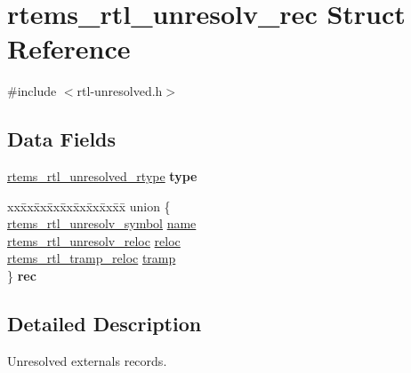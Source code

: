 \hypertarget{structrtems__rtl__unresolv__rec}{}\section{rtems\+\_\+rtl\+\_\+unresolv\+\_\+rec Struct Reference}
\label{structrtems__rtl__unresolv__rec}


{\ttfamily \#include $<$rtl-\/unresolved.\+h$>$}

\subsection*{Data Fields}
\begin{DoxyCompactItemize}
\item 
\mbox{\label{structrtems__rtl__unresolv__rec_ac08e3b3b2a8c3d893ed420b2c94ccee2}} 
\mbox{\hyperlink{rtl-unresolved_8h_a4c5be38f1158006e6bc839d4f060ecb6}{rtems\+\_\+rtl\+\_\+unresolved\+\_\+rtype}} {\bfseries type}
\item 
\mbox{\label{structrtems__rtl__unresolv__rec_a55c7932f4998130cf1d7d1c0a796baa7}} 
\begin{tabbing}
xx\=xx\=xx\=xx\=xx\=xx\=xx\=xx\=xx\=\kill
union \{\\
\>\mbox{\hyperlink{structrtems__rtl__unresolv__symbol}{rtems\_rtl\_unresolv\_symbol}} \mbox{\hyperlink{structrtems__rtl__unresolv__rec_a2d0b1f9feb91f2330d91166efe13dea0}{name}}\\
\>\mbox{\hyperlink{structrtems__rtl__unresolv__reloc}{rtems\_rtl\_unresolv\_reloc}} \mbox{\hyperlink{structrtems__rtl__unresolv__rec_abcdc5fbd48b7631d32938251513938e3}{reloc}}\\
\>\mbox{\hyperlink{structrtems__rtl__tramp__reloc}{rtems\_rtl\_tramp\_reloc}} \mbox{\hyperlink{structrtems__rtl__unresolv__rec_a7916e67c4ea764cf5aa1a152523edfd0}{tramp}}\\
\} {\bfseries rec}\\

\end{tabbing}\end{DoxyCompactItemize}


\subsection{Detailed Description}
Unresolved externals records. 

